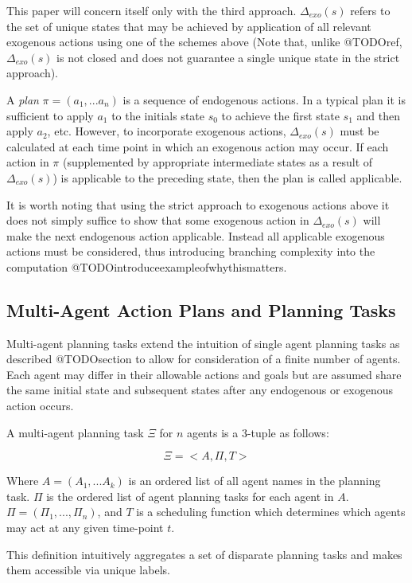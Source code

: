 \documentclass{article}
\theoremstyle{plain}
\theoremstyle{definition}
\begin{document}
This paper will concern itself only with the third approach. $\Delta_{exo}(s)$ refers to the set of unique states that may be achieved by application of all relevant exogenous actions using one of the schemes above (Note that, unlike @TODOref, $\Delta_{exo}(s)$ is not closed and does not guarantee a single unique state in the strict approach).

A \textit{plan} $\pi=(a_1,...a_n)$ is a sequence of endogenous actions. In a typical plan it is sufficient to apply $a_1$ to the initials state $s_0$ to achieve the first state $s_1$ and then apply $a_2$, etc. However, to incorporate exogenous actions, $\Delta_{exo}(s)$ must be calculated at each time point in which an exogenous action may occur. If each action in $\pi$ (supplemented by appropriate intermediate states as a result of $\Delta_{exo}(s)$) is applicable to the preceding state, then the plan is called applicable. 

It is worth noting that using the strict approach to exogenous actions above it does not simply suffice to show that some exogenous action in $\Delta_{exo}(s)$ will make the next endogenous action applicable. Instead all applicable exogenous actions must be considered, thus introducing branching complexity into the computation @TODOintroduceexampleofwhythismatters.



\subsection{Multi-Agent Action Plans and Planning Tasks}
Multi-agent planning tasks extend the intuition of single agent planning tasks as described @TODOsection to allow for consideration of a finite number of agents. Each agent may differ in their allowable actions and goals but are assumed share the same initial state and subsequent states after any endogenous or exogenous action occurs.

A multi-agent planning task $\Xi$ for $n$ agents is a 3-tuple as follows:

\[
\Xi = <A, \Pi, T>
\]

 Where $A=(A_1,...A_k)$ is an ordered list of all agent names in the planning task. $\Pi$ is the ordered list of agent planning tasks for each agent in $A$. $\Pi=(\Pi_1,...,\Pi_n)$, and $T$ is a scheduling function which determines which agents may act at any given time-point $t$.
 
This definition intuitively aggregates a set of disparate planning tasks and makes them accessible via unique labels.
\end{document}
